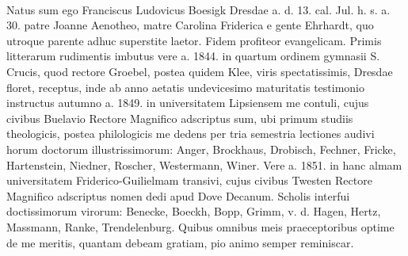 \documentclass[a4paper, 11pt, oneside, polutonikogreek, german]{article}
\begin{document}
\paragraph{}
Natus sum ego Franciscus Ludovicus Boesigk Dresdae a. d. 13. cal. Jul. h. s. a. 30. patre Joanne Aenotheo, matre Carolina Friderica e gente Ehrhardt, quo utroque parente adhuc superstite laetor. Fidem profiteor evangelicam. Primis litterarum rudimentis imbutus vere a. 1844. in quartum ordinem gymnasii S. Crucis, quod rectore Groebel, postea quidem Klee, viris spectatissimis, Dresdae floret, receptus, inde ab anno aetatis undevicesimo maturitatis testimonio instructus autumno a. 1849. in universitatem Lipsiensem me contuli, cujus civibus Buelavio Rectore Magnifico adscriptus sum, ubi primum studiis theologicis, postea philologicis me dedens per tria semestria lectiones audivi horum doctorum illustrissimorum: Anger, Brockhaus, Drobisch, Fechner, Fricke, Hartenstein, Niedner, Roscher, Westermann, Winer. Vere a. 1851. in hanc almam universitatem Friderico-Guilielmam transivi, cujus civibus Twesten Rectore Magnifico adscriptus nomen dedi apud Dove Decanum. Scholis interfui doctissimorum virorum: Benecke, Boeckh, Bopp, Grimm, v. d. Hagen, Hertz, Massmann, Ranke, Trendelenburg. Quibus omnibus meis praeceptoribus optime de me meritis, quantam debeam gratiam, pio animo semper reminiscar.
\end{document}
